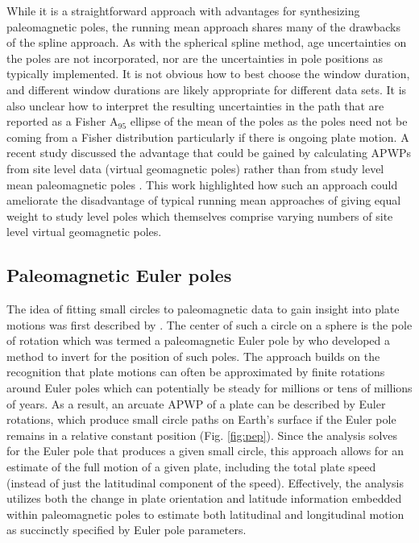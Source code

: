 \documentclass[]{agujournal2019}
\begin{document}
While it is a straightforward approach with advantages for synthesizing paleomagnetic poles, the running mean approach shares many of the drawbacks of the spline approach. As with the spherical spline method, age uncertainties on the poles are not incorporated, nor are the uncertainties in pole positions as typically implemented. It is not obvious how to best choose the window duration, and different window durations are likely appropriate for different data sets. It is also unclear how to interpret the resulting uncertainties in the path that are reported as a Fisher A$_{95}$ ellipse of the mean of the poles as the poles need not be coming from a Fisher distribution particularly if there is ongoing plate motion. A recent study discussed the advantage that could be gained by calculating APWPs from site level data (virtual geomagnetic poles) rather than from study level mean paleomagnetic poles \cite{Vaes2022a}. This work highlighted how such an approach could ameliorate the disadvantage of typical running mean approaches of giving equal weight to study level poles which themselves comprise varying numbers of site level virtual geomagnetic poles.

\subsection*{Paleomagnetic Euler poles}
The idea of fitting small circles to paleomagnetic data to gain insight into plate motions was first described by . The center of such a circle on a sphere is the pole of rotation which was termed a paleomagnetic Euler pole by  who developed a method to invert for the position of such poles. The approach builds on the recognition that plate motions can often be approximated by finite rotations around Euler poles which can potentially be steady for millions or tens of millions of years. As a result, an arcuate APWP of a plate can be described by Euler rotations, which produce small circle paths on Earth's surface if the Euler pole remains in a relative constant position (Fig. \ref{fig:pep}). Since the analysis solves for the Euler pole that produces a given small circle, this approach allows for an estimate of the full motion of a given plate, including the total plate speed (instead of just the latitudinal component of the speed). Effectively, the analysis utilizes both the change in plate orientation and latitude information embedded within paleomagnetic poles to estimate both latitudinal and longitudinal motion as succinctly specified by Euler pole parameters.
\end{document}
